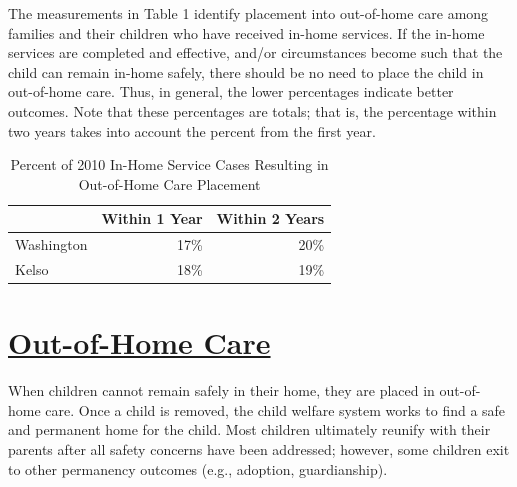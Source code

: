 \documentclass{article}\usepackage[]{graphicx}\usepackage[]{color}
\begin{document}
The measurements in Table 1 identify placement into out-of-home care among families and their children who have received in-home services. If the in-home services are completed and effective, and/or circumstances become such that the child can remain in-home safely, there should be no need to place the child in out-of-home care. Thus, in general, the lower percentages indicate better outcomes. Note that these percentages are totals; that is, the percentage within two years takes into account the percent from the first year.
\vspace{12pt}
\begin{table}[ht]
\centering
\caption{Percent of 2010 In-Home Service Cases Resulting in Out-of-Home Care Placement} 
\begin{tabular}{lrr}
  \toprule
 & Within 1 Year & Within 2 Years \\ 
  \midrule
Washington & 17\% & 20\% \\ 
  Kelso & 18\% & 19\% \\ 
   \bottomrule
\end{tabular}
\end{table}



\newpage
\section{\href{http://www.partnersforourchildren.org/child-well-being/visualizations/out-home-care/trends}
    {Out-of-Home Care}
}
When children cannot remain safely in their home, they are placed in out-of-home care. Once a child is removed, the child welfare system works to find a safe and permanent home for the child. Most children ultimately reunify with their parents after all safety concerns have been addressed; however, some children exit to other permanency outcomes (e.g., adoption, guardianship).\\[6pt]

\label{p:ooh}
\end{document}
